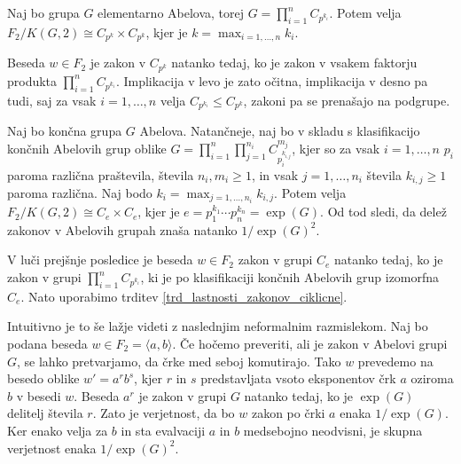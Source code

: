 \begin{posledica}
\label{psl_lastnosti_zakonov_elementarno_abelove}
Naj bo grupa $G$ elementarno Abelova, torej $G = \prod_{i = 1}^{n} C_{p^{k_{i}}}$. Potem velja $F_2 / K(G, 2) \cong C_{p^{k}} \times C_{p^{k}}$, kjer je $k = \max_{i = 1 , \ldots , n} k_i$.
\end{posledica}
\begin{dokaz}
 Beseda $w \in F_2$ je zakon v $C_{p^{k}}$ natanko tedaj, ko je zakon v vsakem faktorju produkta $\prod_{i = 1}^{n} C_{p^{k_{i}}}$. Implikacija v levo je zato očitna, implikacija v desno pa tudi,
saj za vsak $i = 1 , \ldots , n$ velja $C_{p^{k_{i}}} \le C_{p^{k}}$, zakoni pa se prenašajo na podgrupe.
\end{dokaz}

\begin{posledica}
\label{psl_lastnosti_zakonov_splosni_produkti_ciklicnih}
Naj bo končna grupa $G$ Abelova. Natančneje, naj bo v skladu s klasifikacijo končnih Abelovih grup oblike $G = \prod_{i = 1}^{n} \prod_{j = 1}^{n_i} C_{p_{i}^{k_{i,j}}}^{m_j}$, kjer so za vsak $i = 1, \ldots, n$ $p_i$ paroma različna praštevila, števila $n_i, m_{i} \ge 1$, in vsak $j = 1, \ldots , n_i$ števila $k_{i, j} \ge 1$ paroma različna. %
Naj bodo $k_i = \max_{j = 1, \ldots, n_i} k_{i,j}$. Potem velja $F_2 / K(G, 2) \cong C_{e} \times C_{e}$, kjer je $e = p_1^{k_1} \cdots  p_n^{k_n}  = \exp(G)$.
Od tod sledi, da delež zakonov v Abelovih grupah znaša natanko $1 / \exp(G)^2$.
\end{posledica}
\begin{dokaz}
V luči prejšnje posledice je beseda $w \in F_2$ zakon v grupi $C_e$ natanko tedaj, ko je zakon v grupi $\prod_{i = 1}^{n} C_{p^{k_i}}$, ki je po klasifikaciji končnih Abelovih grup izomorfna $C_e$.
Nato uporabimo trditev \ref{trd_lastnosti_zakonov_ciklicne}.
\end{dokaz}
Intuitivno je to še lažje videti z naslednjim neformalnim razmislekom.
Naj bo podana beseda $w \in F_2 = \langle a, b \rangle$. Če hočemo preveriti, ali je zakon v Abelovi grupi $G$, se lahko pretvarjamo, da črke med seboj komutirajo. Tako $w$ prevedemo na besedo oblike $w' = a^r b^s$,
kjer $r$ in $s$ predstavljata vsoto eksponentov črk $a$ oziroma $b$ v besedi $w$. Beseda $a^r$ je zakon v grupi $G$ natanko tedaj, ko je $\exp(G)$ delitelj števila $r$. Zato je verjetnost, da bo $w$ zakon po črki $a$ enaka $1 / \exp(G)$. %
Ker enako velja za $b$ in sta evalvaciji $a$ in $b$ medsebojno neodvisni, je skupna verjetnost enaka $1 / \exp(G)^2$.





